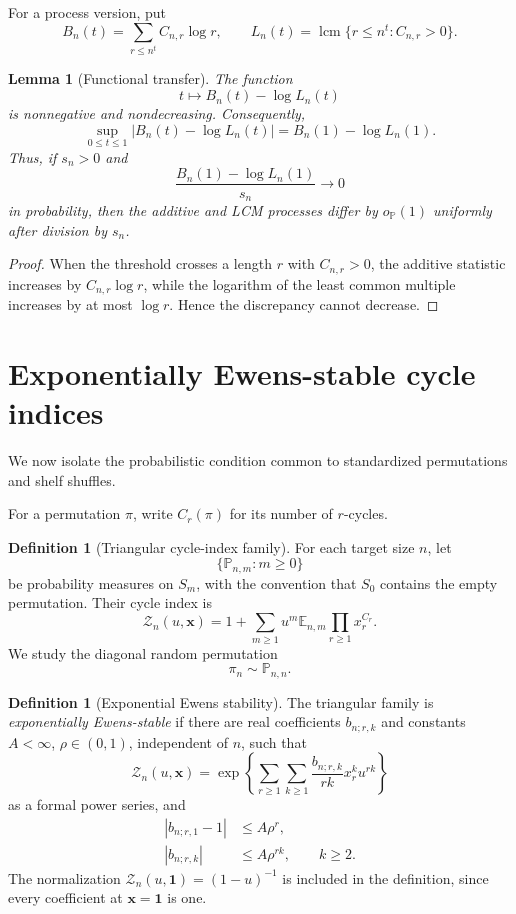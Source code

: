 \documentclass[11pt]{article}
\newtheorem{lemma}[theorem]{Lemma}
\theoremstyle{definition}
\newtheorem{definition}[theorem]{Definition}
\theoremstyle{remark}
\newcommand{\Pp}{\mathbb P}
\newcommand{\Ee}{\mathbb E}
\newcommand{\lcm}{\operatorname{lcm}}
\newcommand{\cZ}{\mathcal Z}
\begin{document}
For a process version, put
\[
 B_n(t)=\sum_{r\le n^t}C_{n,r}\log r,
 \qquad
 L_n(t)=\lcm\{r\le n^t:C_{n,r}>0\}.
\]

\begin{lemma}[Functional transfer]\label{lem:functional-transfer}
The function
\[
 t\longmapsto B_n(t)-\log L_n(t)
\]
is nonnegative and nondecreasing.  Consequently,
\[
 \sup_{0\le t\le1}
 \bigl|B_n(t)-\log L_n(t)\bigr|
 =
 B_n(1)-\log L_n(1).
\]
Thus, if $s_n>0$ and
\[
 \frac{B_n(1)-\log L_n(1)}{s_n}\longrightarrow0
\]
in probability, then the additive and LCM processes differ by
$o_{\Pp}(1)$ uniformly after division by $s_n$.
\end{lemma}

\begin{proof}
When the threshold crosses a length $r$ with $C_{n,r}>0$, the additive
statistic increases by $C_{n,r}\log r$, while the logarithm of the least
common multiple increases by at most $\log r$.  Hence the discrepancy
cannot decrease.
\end{proof}

\section{Exponentially Ewens-stable cycle indices}

We now isolate the probabilistic condition common to standardized
permutations and shelf shuffles.

For a permutation $\pi$, write $C_r(\pi)$ for its number of $r$-cycles.

\begin{definition}[Triangular cycle-index family]\label{def:triangular}
For each target size $n$, let
\[
 \{\Pp_{n,m}:m\ge0\}
\]
be probability measures on $S_m$, with the convention that $S_0$ contains
the empty permutation.  Their cycle index is
\[
 \cZ_n(u,\mathbf x)
 =
 1+\sum_{m\ge1}u^m
 \Ee_{n,m}\prod_{r\ge1}x_r^{C_r}.
\]
We study the diagonal random permutation
\[
 \pi_n\sim\Pp_{n,n}.
\]
\end{definition}

\begin{definition}[Exponential Ewens stability]\label{def:stability}
The triangular family is \emph{exponentially Ewens-stable} if there are
real coefficients $b_{n;r,k}$ and constants $A<\infty$, $\rho\in(0,1)$,
independent of $n$, such that
\begin{equation}\label{eq:cycle-index-form}
 \cZ_n(u,\mathbf x)
 =
 \exp\left\{
 \sum_{r\ge1}\sum_{k\ge1}
 \frac{b_{n;r,k}}{rk}x_r^k u^{rk}
 \right\}
\end{equation}
as a formal power series, and
\begin{align}
 |b_{n;r,1}-1|&\le A\rho^r,
 \label{eq:stability-one}\\
 |b_{n;r,k}|&\le A\rho^{rk},
 \qquad k\ge2.
 \label{eq:stability-high}
\end{align}
The normalization $\cZ_n(u,\mathbf1)=(1-u)^{-1}$ is included in the
definition, since every coefficient at $\mathbf x=\mathbf1$ is one.
\end{definition}
\end{document}
